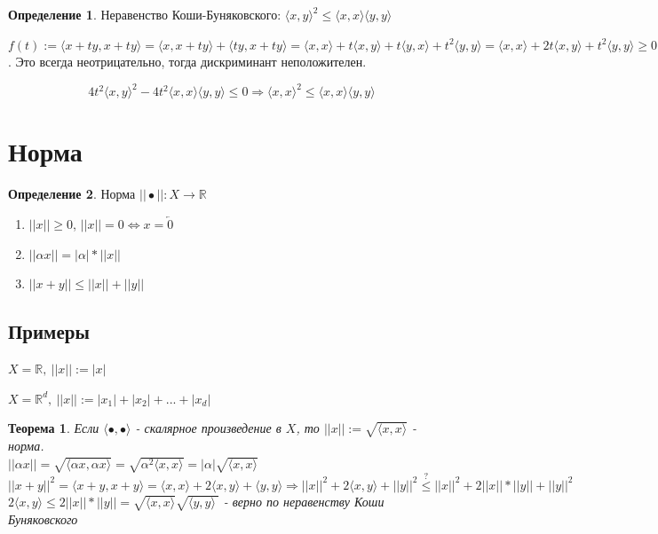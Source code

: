 \documentclass[12pt,letterpaper]{report}
\makeatletter
\newtheorem*{theorem-non}{Теорема}
\theoremstyle{definition}
\newtheorem*{conj}{Определение}
\renewenvironment{proof}[1][\proofname]{%
   \par\pushQED{\qed}\normalfont%
   \topsep6\p@\@plus6\p@\relax
   \trivlist\item[\hskip\labelsep\bfseries#1\@addpunct{.}]%
   \ignorespaces
}{%
   \popQED\endtrivlist\@endpefalse
}
\makeatother
\begin{document}
    \begin{conj}
        Неравенство Коши-Буняковского: $\langle x, y \rangle^2 \leq \langle x, x \rangle \langle y, y \rangle$
    \end{conj} 
    
    \begin{proof}
    
    $f(t):=\langle x+ty, x+ty\rangle = \langle x, x+ty \rangle + \langle ty, x+ty \rangle =\langle x, x \rangle + t\langle x, y \rangle + t\langle y, x \rangle + t^2\langle y, y \rangle = \langle x, x \rangle + 2t\langle x, y \rangle + t^2\langle y, y \rangle \geq 0$. Это всегда неотрицательно, тогда дискриминант неположителен.

    \[4t^2\langle x, y \rangle^2 - 4t^2\langle x, x \rangle \langle y, y \rangle \leq 0 \Longrightarrow \langle x, x \rangle^2 \leq \langle x, x \rangle \langle y, y \rangle\]
    \end{proof}

    \section{Норма}
    
    \begin{conj}
        Норма $||\bullet || : X\to \mathbb{R}$\\
        \begin{enumerate}
            \item $||x|| \geq 0$, $||x|| = 0 \Longleftrightarrow x = \overleftarrow{0}$
            \item $||\alpha x|| = |\alpha|*||x||$
            \item $||x+y|| \leq ||x||+||y||$
        \end{enumerate}
    \end{conj}
    
    \subsection*{Примеры}
    $X = \mathbb{R},\ ||x||:=|x|$
    
    $X = \mathbb{R}^d,\ ||x||:=|x_1|+|x_2|+...+|x_d|$
    \newpage
    \begin{theorem-non}
        Если $\langle \bullet, \bullet \rangle$ - скалярное произведение в $X$, то $||x||:= \sqrt{\langle x, x \rangle}$ - норма.\\
        $||\alpha x|| = \sqrt{\langle \alpha x, \alpha x\rangle} = \sqrt{\alpha^2 \langle x, x\rangle} = |\alpha|\sqrt{\langle x, x \rangle}$\\
        $||x+y||^2 = \langle x+y, x+y \rangle = \langle x,x\rangle + 2\langle x, y\rangle + \langle y, y\rangle \Longrightarrow ||x||^2 + 2\langle x, y\rangle + ||y||^2 \overset{?}{\leq} ||x||^2 + 2||x||*||y|| + ||y||^2$ \vspace*{0,001cm}\\
        $2\langle x, y \rangle \leq 2||x||*||y|| = \sqrt{\langle x, x\rangle}\sqrt{\langle y, y\rangle\ }$ - верно по неравенству Коши Буняковского
    \end{theorem-non}
    
\end{document}
